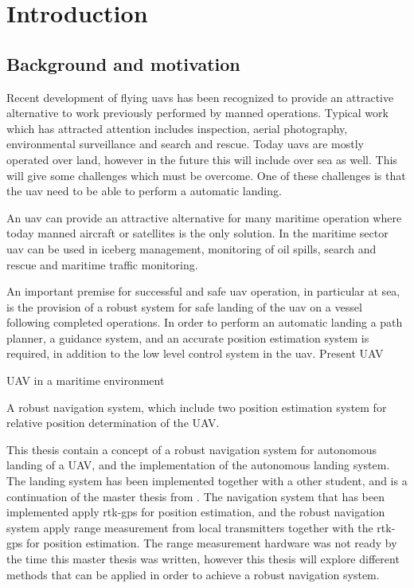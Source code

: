 
\chapter{Introduction}

\section{Background and motivation}
Recent development of flying \glspl{uav} has been recognized to provide an attractive alternative to work previously performed by manned operations. Typical work which has attracted attention includes inspection, aerial photography, environmental surveillance and search and rescue. Today \glspl{uav} are mostly operated over land, however in the future this will include over sea as well. This will give some challenges which must be overcome. One of these challenges is that the \gls{uav} need to be able to perform a automatic landing.

An \gls{uav} can provide an attractive alternative for many maritime operation where today manned aircraft or satellites is the only solution. In the maritime sector \gls{uav} can be used in iceberg management, monitoring of oil spills, search and rescue and maritime traffic monitoring.

An important premise for successful and safe \gls{uav} operation, in particular at sea, is the provision of a robust system for safe landing of the \gls{uav} on a vessel following completed operations. In order to perform an automatic landing a path planner, a guidance system, and an accurate position estimation system is required, in addition to the low level control system in the \gls{uav}.
Present UAV

UAV in a maritime environment

A robust navigation system, which include two position estimation system for relative position determination of the UAV. 

This thesis contain a concept of a robust navigation system for autonomous landing of a UAV, and the implementation of the autonomous landing system. The landing system has been implemented together with a other student, and is a continuation of the master thesis from \citep{Froelich}. The navigation system that has been implemented apply rtk-gps for position estimation, and the robust navigation system apply range measurement from local transmitters together with the rtk-gps for position estimation. The range measurement hardware was not ready by the time this master thesis was written, however this thesis will explore different methods that can be applied in order to achieve a robust navigation system.

